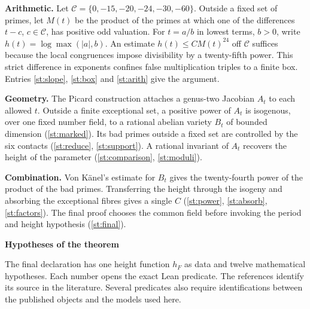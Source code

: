 \documentclass[10pt,a4paper]{article}
\newcommand{\sectitle}[1]{{\large\bfseries #1}\par}
\begin{document}
\textbf{Arithmetic.} Let $\mathcal C=\{0,-15,-20,-24,-30,-60\}$. Outside a fixed set of primes, let $M(t)$ be the product of the primes at which one of the differences $t-c$, $c\in\mathcal C$, has positive odd valuation. For $t=a/b$ in lowest terms, $b>0$, write $h(t)=\log\max(|a|,b)$. An estimate $h(t)\le C M(t)^{24}$ off $\mathcal C$ suffices because the local congruences impose divisibility by a twenty-fifth power. This strict difference in exponents confines false multiplication triples to a finite box. Entries \hyperref[st:slope]{\ref*{st:slope}}, \hyperref[st:box]{\ref*{st:box}} and \hyperref[st:arith]{\ref*{st:arith}} give the argument.

\textbf{Geometry.} The Picard construction attaches a genus-two Jacobian $A_t$ to each allowed $t$. Outside a finite exceptional set, a positive power of $A_t$ is isogenous, over one fixed number field, to a rational abelian variety $B_t$ of bounded dimension (\hyperref[st:marked]{\ref*{st:marked}}). Its bad primes outside a fixed set are controlled by the six contacts (\hyperref[st:reduce]{\ref*{st:reduce}}, \hyperref[st:support]{\ref*{st:support}}). A rational invariant of $A_t$ recovers the height of the parameter (\hyperref[st:comparison]{\ref*{st:comparison}}, \hyperref[st:moduli]{\ref*{st:moduli}}).

\textbf{Combination.} Von Känel's estimate for $B_t$ gives the twenty-fourth power of the product of the bad primes. Transferring the height through the isogeny and absorbing the exceptional fibres gives a single $C$ (\hyperref[st:power]{\ref*{st:power}}, \hyperref[st:absorb]{\ref*{st:absorb}}, \hyperref[st:factors]{\ref*{st:factors}}). The final proof chooses the common field before invoking the period and height hypothesis (\hyperref[st:final]{\ref*{st:final}}).
\clearpage
{}\label{register}
\sectitle{Hypotheses of the theorem}
The final declaration has one height function $h_F$ as data and twelve mathematical hypotheses. Each number opens the exact Lean predicate. The references identify its source in the literature. Several predicates also require identifications between the published objects and the models used here.
\medskip
\end{document}
